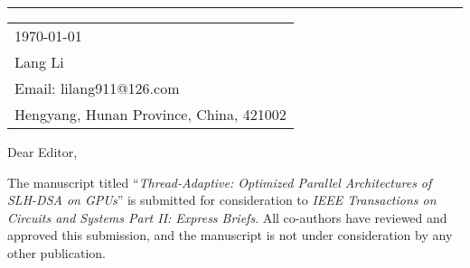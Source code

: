 \documentclass{article}
\begin{document}



\rule{\linewidth}{1pt} %

\bigskip\bigskip %


\hfill
\begin{tabular}{l @{}}
\hfill \today \bigskip\\ %
\hfill Lang Li \\
\hfill Email: lilang911@126.com \\
\hfill Hengyang, Hunan Province, China, 421002 \\ %
\end{tabular}

\bigskip %



\bigskip %

Dear Editor,

\bigskip %


The manuscript titled ``\textit{Thread-Adaptive: Optimized Parallel Architectures of SLH-DSA on GPUs}'' is submitted for consideration to \textit{IEEE Transactions on Circuits and Systems Part II: Express Briefs}. All co-authors have reviewed and approved this submission, and the manuscript is not under consideration by any other publication.
\end{document}
